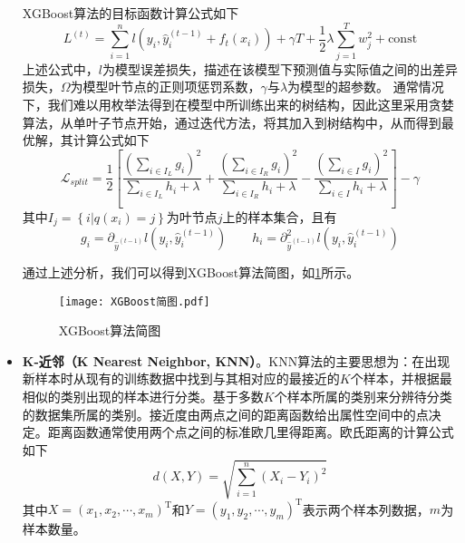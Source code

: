 \documentclass{MathorCupmodeling}
\begin{document}
\begin{itemize}
		XGBoost算法的目标函数计算公式如下
		\begin{equation}
			L^{\left(t\right)}=\sum\limits_{i=1}^{n}l\left(y_i,\hat{y}_{i}^{\left(t-1\right)}+f_t\left(x_i\right)\right)+\gamma T+\frac{1}{2}\lambda\sum\limits_{j=1}^T{w_j^2}+\mathrm{const} \label{fXGBoostL}
		\end{equation}
		上述公式中，$l$为模型误差损失，描述在该模型下预测值与实际值之间的出差异损失，$\Omega$为模型叶节点的正则项惩罚系数，$\gamma$与$\lambda$为模型的超参数\textcolor{blue}{\cite{pxgboost2}}。
		通常情况下，我们难以用枚举法得到在模型中所训练出来的树结构，因此这里采用贪婪算法，从单叶子节点开始，通过迭代方法，将其加入到树结构中，从而得到最优解，其计算公式\textcolor{blue}{\cite{pxgboost3}}如下
		\begin{equation}
			\mathcal{L}_{split}=\frac{1}{2}\left[\frac{\left(\sum_{i\in I_L}g_i\right)^2}{\sum_{i\in I_L}h_i+\lambda}+\frac{\left(\sum_{i\in I_R}g_i\right)^2}{\sum_{i\in I_R}h_i+\lambda}-\frac{\left(\sum_{i\in I}g_i\right)^2}{\sum_{i\in I}h_i+\lambda}\right]-\gamma \label{fXGBoostLsplit}
		\end{equation}
		其中$I_j=\left\{i|q\left(x_i\right)=j\right\}$为叶节点$j$上的样本集合\textcolor{blue}{\cite{pxgboost2}}，且有
		\begin{equation}
			g_i=\partial_{\hat{y}^{\left(t-1\right)}}l\left(y_i,\hat{y}_i^{\left(t-1\right)}\right)\qquad h_i=\partial_{\hat{y}^{\left(t-1\right)}}^2l\left(y_i,\hat{y}_i^{\left(t-1\right)}\right) \label{xgboostgihi}
		\end{equation}
	
		通过上述分析，我们可以得到XGBoost算法简图，如\textcolor{blue}{\cref{fig:XGBoost}}所示。
		\begin{figure}[h!t]
			\centerline{\texttt{[image: XGBoost简图.pdf]}}
			\caption{XGBoost算法简图}\label{fig:XGBoost}
		\end{figure}
		\item \textbf{K-近邻（K Nearest Neighbor, KNN）}。KNN算法的主要思想为：在出现新样本时从现有的训练数据中找到与其相对应的最接近的$K$个样本，并根据最相似的类别出现的样本进行分类。基于多数$K$个样本所属的类别来分辨待分类的数据集所属的类别\textcolor{blue}{\cite{pknn}}。接近度由两点之间的距离函数给出属性空间中的点决定。距离函数通常使用两个点之间的标准欧几里得距离。欧氏距离的计算公式如下
		\begin{equation}
			d(X, Y)=\sqrt{\sum\limits_{i=1}^{n}\left(X_{i}-Y_{i}\right)^{2}} \label{fdistance}
		\end{equation}
		其中$X=\left(x_{1},x_{2},\cdots,x_{m}\right)^{\mathrm{T}}$和$Y=\left(y_{1},y_{2},\cdots,y_{m}\right)^{\mathrm{T}}$表示两个样本列数据，$m$为样本数量。
		

\end{itemize}
\end{document}
